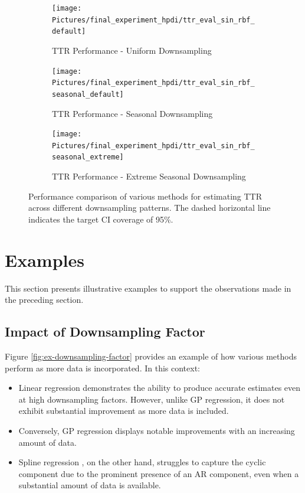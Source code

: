 \begin{figure}[!htb]
\centering
\begin{subfigure}{\textwidth}
    \centering
    \texttt{[image: Pictures/final\_experiment\_hpdi/ttr\_eval\_sin\_rbf\_default]}
    \caption{TTR Performance - Uniform Downsampling}
    \label{fig:ttr-uniform-sampling-performance}
\end{subfigure}

\bigskip

\begin{subfigure}{\textwidth}
    \centering
    \texttt{[image: Pictures/final\_experiment\_hpdi/ttr\_eval\_sin\_rbf\_seasonal\_default]}
    \caption{TTR Performance - Seasonal Downsampling}
    \label{fig:ttr-seasonal-sampling-performance}
\end{subfigure}

\bigskip

\begin{subfigure}{\textwidth}
    \centering
    \texttt{[image: Pictures/final\_experiment\_hpdi/ttr\_eval\_sin\_rbf\_seasonal\_extreme]}
    \caption{TTR Performance - Extreme Seasonal Downsampling}
    \label{fig:ttr-extreme-seasonal-sampling-performance}
\end{subfigure}

\caption[TTR Performance]{Performance comparison of various methods for
estimating TTR across different downsampling patterns.
The dashed horizontal line indicates the target CI coverage of 95\%.
}
\label{fig:ttr-performance}
\end{figure}


\section{Examples}
This section presents illustrative examples to support the observations made in
the preceding section.


\subsection{Impact of Downsampling Factor}


Figure \ref{fig:ex-downsampling-factor} provides an example of how various
methods perform as more data is incorporated. In this context:

\begin{itemize}
    \item Linear regression demonstrates the ability to produce accurate estimates even
    at high downsampling factors. However, unlike GP regression, it does not exhibit
    substantial improvement as more data is included.
    \item Conversely, GP regression displays notable improvements with an
    increasing amount of data.
    \item Spline regression , on the other hand, struggles to capture the cyclic
    component due to the prominent presence of an AR component, even when a
    substantial amount of data is available.
\end{itemize}

